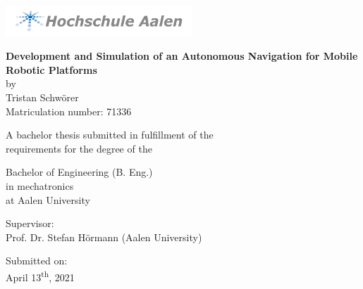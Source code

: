 \begin{titlepage}

\center\includegraphics[width=70mm]{Pictures/Logo_HSAA}

\vspace*{8mm} %
\begin{center} %
	
	\Huge\center\textbf{Development and Simulation of an Autonomous Navigation for Mobile Robotic Platforms}\\ %
	\vspace*{11mm}
	\Large{by}\\
	\Large{Tristan Schwörer}\\
	\Large{Matriculation number: 71336}\\
	
	\vspace*{11mm}
	
	\Large{A bachelor thesis submitted in fulfillment of the}\\
	\Large{requirements for the degree of the}\\
	
	\vspace*{11mm}
	
	\Large{Bachelor of Engineering (B. Eng.)}\\
	\Large{in mechatronics}\\
	\Large{at Aalen University}\\
	
	\vspace*{11mm}
	
	\Large{Supervisor:}\\
	\Large{Prof. Dr. Stefan Hörmann (Aalen University)}\\
	
	\vspace*{11mm}
	
	\Large{Submitted on:}\\
	\Large{April 13\textsuperscript{th}, 2021}\\
\end{center}
\end{titlepage}
